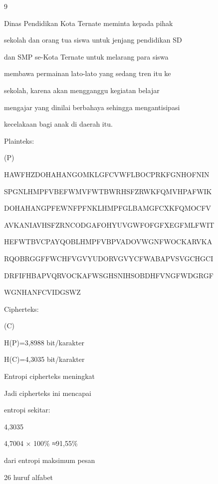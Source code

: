 \documentclass{article}
\begin{document}

9

Dinas Pendidikan Kota Ternate meminta kepada pihak 

sekolah dan orang tua siswa untuk jenjang pendidikan SD 

dan SMP se-Kota Ternate untuk melarang para siswa 

membawa permainan lato-lato yang sedang tren itu ke 

sekolah, karena akan mengganggu kegiatan belajar 

mengajar yang dinilai berbahaya sehingga mengantisipasi 

kecelakaan bagi anak di daerah itu.

Plainteks:

(P)

HAWFHZDOHAHANGOMKLGFCVWFLBOCPRKFGNHOFNIN

SPGNLHMPFVBEFWMVFWTBWRHSFZRWKFQMVHPAFWIK

DOHAHANGPFEWNFPFNKLHMPFGLBAMGFCXKFQMOCFV

AVKANIAVHSFZRNCODGAFOHYUVGWFOFGFXEGFMLFWIT

HEFWTBVCPAYQOBLHMPFVBPVADOVWGNFWOCKARVKA

RQOBRGGFFWCHFVGVYUDORVGVYCFWABAPVSVGCHGCI

DRFIFHBAPVQRVOCKAFWSGHSNIHSOBDHFVNGFWDGRGF

WGNHANFCVIDGSWZ

Cipherteks:

(C)

H(P)=3,8988 bit/karakter

H(C)=4,3035 bit/karakter

Entropi cipherteks meningkat

Jadi cipherteks ini mencapai 

entropi sekitar:

4,3035

4,7004 × 100\% ≈91,55\%

dari entropi maksimum pesan 

26 huruf alfabet
\end{document}
